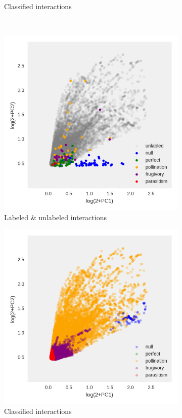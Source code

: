 \begin{figure}
\begin{subfigure}[b]{0.45\textwidth}
        \caption{Classified interactions}
    \end{subfigure}\\
        \begin{subfigure}[b]{0.45\textwidth}
        \includegraphics[width=\textwidth]{FishPoo/figures/codiv_literature_fishpoo_classified_PCA_a.png}
        \caption{Labeled \& unlabeled interactions}
    \end{subfigure}
        \begin{subfigure}[b]{0.45\textwidth}
        \includegraphics[width=\textwidth]{FishPoo/figures/codiv_literature_fishpoo_classified_PCA_b.png}
        \caption{Classified interactions}
    \end{subfigure}
    \caption{}
    \label{fig:FP_classified}
\end{figure}